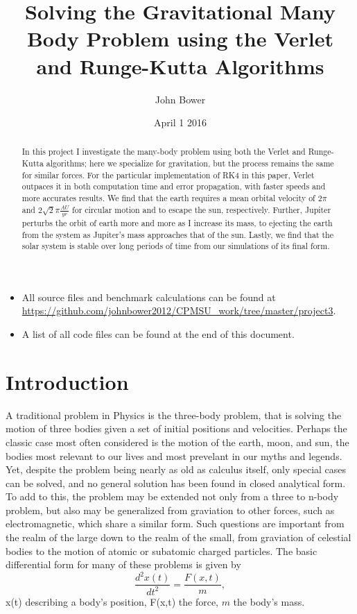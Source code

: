 \documentclass[11pt,a4paper]{article}
\title{Solving the Gravitational Many Body Problem using the Verlet and Runge-Kutta Algorithms}
\author{John Bower}
\date{April 1 2016}
\begin{document}
\maketitle

\begin{abstract}

In this project I investigate the many-body problem using both the Verlet and Runge-Kutta algorithms; here we specialize for gravitation, but the process remains the same for similar forces. For the particular implementation of RK4 in this paper, Verlet outpaces it in both computation time and error propagation, with faster speeds and more accurates results. We find that the earth requires a mean orbital velocity of $2\pi$ and $2\sqrt{2}\pi \frac{AU}{yr}$ for circular motion and to escape the sun, respectively. Further, Jupiter perturbs the orbit of earth more and more as I increase its mass, to ejecting the earth from the system as Jupiter's mass approaches that of the sun. Lastly, we find that the solar system is stable over long periods of time from our simulations of its final form.

\end{abstract}

\begin{itemize}
\item All source files and benchmark calculations can be found at \url{https://github.com/johnbower2012/CPMSU_work/tree/master/project3}.
\item A list of all code files can be found at the end of this document.
\end{itemize}

\section{Introduction}

A traditional problem in Physics is the three-body problem, that is solving the motion of three bodies given a set of initial positions and velocities. Perhaps the classic case most often considered is the motion of the earth, moon, and sun, the bodies most relevant to our lives and most prevelant in our myths and legends. Yet, despite the problem being nearly as old as calculus itself, only special cases can be solved, and no general solution has been found in closed analytical form. To add to this, the problem may be extended not only from a three to n-body problem, but also may be generalized from graviation to other forces, such as electromagnetic, which share a similar form. Such questions are important from the realm of the large down to the realm of the small, from graviation of celestial bodies to the motion of atomic or subatomic charged particles. The basic differential form for many of these problems is given by
\begin{equation}
\frac{d^2x(t)}{dt^2} = \frac{F(x,t)}{m},
\end{equation}
x(t) describing a body's position, F(x,t) the force, $m$ the body's mass.
\end{document}
